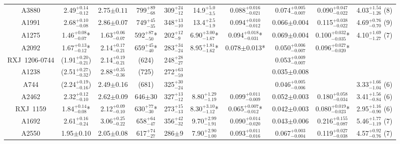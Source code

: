 \begin{table}
\begin{center}
{\begin{tabular}{cccccccccc}
    A3880 & 2.49$^{+0.14}_{-0.12}$ & 2.75$\pm0.11$ & 799$^{+89}_{-68}$ & 309$^{+24}_{-12}$ & 14.9$^{+5.0}_{-3.5}$ & 0.088$^{+0.016}_{-0.021}$ & 0.074$^{+0.005}_{-0.007}$ & 0.090$^{+0.047}_{-0.022}$ & 4.03$^{+1.54}_{-1.26}$ (8) \\
    A1991 & 2.68$^{+0.10}_{-0.08}$ & 2.86$\pm0.07$ & 749$^{+45}_{-35}$ & 348$^{+13}_{-10}$ & 13.4$^{+2.5}_{-1.9}$ & 0.094$^{+0.010}_{-0.012}$ & 0.066$\pm$0.004 & 0.115$^{+0.038}_{-0.022}$ & 4.69$^{+0.76}_{-0.70}$ (9) \\
    A1275 & 1.46$^{+0.08}_{-0.07}$* & 1.63$^{+0.06}_{-0.07}$ & 592$^{+87}_{-50}$* & 202$^{+12}_{-9}$ & 6.90$^{+3.00}_{-1.67}$* & 0.094$^{+0.018}_{-0.031}$* & 0.069$\pm$0.004 & 0.100$^{+0.032}_{-0.035}$* & 4.10$^{+1.69}_{-1.27}$ (7) \\
    A2092 & 1.67$^{+0.13}_{-0.12}$* & 2.14$^{+0.17}_{-0.21}$ & 659$^{+45}_{-40}$* & 283$^{+34}_{-24}$ & 8.95$^{+1.81}_{-1.62}$* & 0.078$\pm$0.013* & 0.050$^{+0.006}_{-0.007}$ & 0.096$^{+0.027}_{-0.020}$* & \\
    RXJ~1206-0744 & (1.91$^{+0.20}_{-0.21}$) & 2.14$^{+0.19}_{-0.21}$ & (624) & 248$^{+28}_{-27}$ & & & 0.053$^{+0.009}_{-0.007}$ & & \\
    A1238    & (2.51$^{+0.27}_{-0.32}$)& 2.88$^{+0.35}_{-0.36}$ & (725) & 272$^{+63}_{-59}$ & & & 0.035$\pm$0.008 & & \\
    A744     & (2.24$^{+0.19}_{-0.16}$) & 2.49$\pm$0.16 & (681) & 325$^{+30}_{-24}$ & & & 0.046$^{+0.005}_{-0.006}$ & & 3.33$^{+1.66}_{-1.04}$ (6) \\
    A2462    & 2.32$^{+0.12}_{-0.10}$ & 2.62$\pm$0.09 & 646$\pm$30 & 327$^{+13}_{-12}$ & 8.80$^{+1.29}_{-1.19}$ & 0.099$^{+0.011}_{-0.009}$ & 0.052$\pm$0.003 & 0.180$^{+0.058}_{-0.034}$ & 3.41$^{+1.56}_{-0.84}$ (6) \\
    RXJ~1159 & 1.84$^{+0.14}_{-0.08}$* & 2.12$^{+0.09}_{-0.10}$ & 630$^{+77}_{-30}$* & 273$^{+15}_{-13}$ & 8.30$^{+3.10}_{-1.12}$* & 0.065$^{+0.007}_{-0.012}$* & 0.042$\pm$0.003 & 0.080$^{+0.019}_{-0.023}$* & 2.95$^{+1.16}_{-0.90}$ (6) \\
    A1692    & 2.61$^{+0.16}_{-0.24}$ & 3.06$^{+0.25}_{-0.22}$ & 658$^{+64}_{-47}$ & 356$^{+42}_{-32}$ & 9.70$^{+2.99}_{-1.91}$ & 0.090$^{+0.014}_{-0.020}$ & 0.043$\pm$0.006 & 0.216$^{+0.155}_{-0.087}$ & 5.46$^{+1.77}_{-1.19}$ (7) \\
    A2550    & 1.95$\pm$0.10 & 2.05$\pm$0.08 & 617$^{+74}_{-27}$ & 286$\pm$9 & 7.90$^{+2.90}_{-1.00}$ & 0.093$^{+0.011}_{-0.016}$ & 0.067$^{+0.003}_{-0.004}$ & 0.119$^{+0.027}_{-0.038}$ & 4.57$^{+0.92}_{-0.76}$ (7) \\

\end{tabular}}
\end{center}
\end{table}
